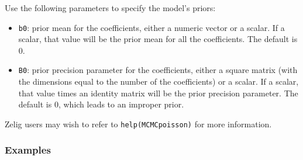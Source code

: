 Use the following parameters to specify the model's priors:  
\begin{itemize}
\item \texttt{b0}: prior mean for the coefficients, either a numeric 
vector or a scalar. If a scalar, that value will be the prior mean for
all the coefficients. The default is 0.

\item \texttt{B0}: prior precision parameter for the coefficients,
either a square matrix (with the dimensions equal to the number of the
coefficients) or a scalar. If a scalar, that value times an identity
matrix will be the prior precision parameter. The default is 0, which
leads to an improper prior.

\end{itemize}

Zelig users may wish to refer to \texttt{help(MCMCpoisson)} for more 
information.



\subsubsection{Examples}


